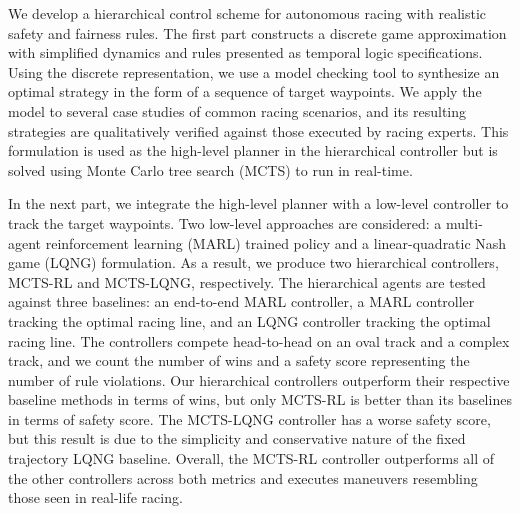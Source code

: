 \documentclass[12pt]{report}
\theoremstyle{definition}
\theoremstyle{remark}
\numberwithin{equation}{section}
\begin{document}
%
\utabstract
\indent 
We develop a hierarchical control scheme for autonomous racing with realistic safety and fairness rules. The first part constructs a discrete game approximation with simplified dynamics and rules presented as temporal logic specifications. Using the discrete representation, we use a model checking tool to synthesize an optimal strategy in the form of a sequence of target waypoints. We apply the model to several case studies of common racing scenarios, and its resulting strategies are qualitatively verified against those executed by racing experts. This formulation is used as the high-level planner in the hierarchical controller but is solved using Monte Carlo tree search (MCTS) to run in real-time.

In the next part, we integrate the high-level planner with a low-level controller to track the target waypoints. Two low-level approaches are considered: a multi-agent reinforcement learning (MARL) trained policy and a linear-quadratic Nash game (LQNG) formulation. As a result, we produce two hierarchical controllers, MCTS-RL and MCTS-LQNG, respectively. The hierarchical agents are tested against three baselines: an end-to-end MARL controller, a MARL controller tracking the optimal racing line, and an LQNG controller tracking the optimal racing line. The controllers compete head-to-head on an oval track and a complex track, and we count the number of wins and a safety score representing the number of rule violations. Our hierarchical controllers outperform their respective baseline methods in terms of wins, but only MCTS-RL is better than its baselines in terms of safety score. The MCTS-LQNG controller has a worse safety score, but this result is due to the simplicity and conservative nature of the fixed trajectory LQNG baseline.  Overall, the MCTS-RL controller outperforms all of the other controllers across both metrics and executes maneuvers resembling those seen in real-life racing.
\end{document}
